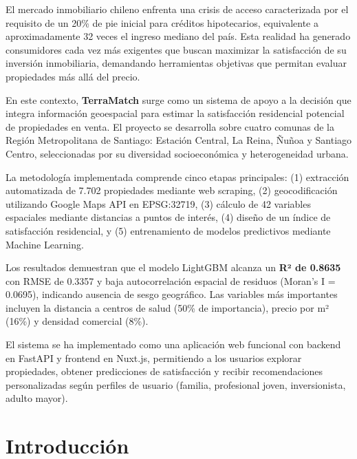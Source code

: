 \documentclass[11pt,letterpaper]{article}
\begin{document}
El mercado inmobiliario chileno enfrenta una crisis de acceso caracterizada por el requisito de un 20\% de pie inicial para créditos hipotecarios, equivalente a aproximadamente 32 veces el ingreso mediano del país. Esta realidad ha generado consumidores cada vez más exigentes que buscan maximizar la satisfacción de su inversión inmobiliaria, demandando herramientas objetivas que permitan evaluar propiedades más allá del precio.

En este contexto, \textbf{TerraMatch} surge como un sistema de apoyo a la decisión que integra información geoespacial para estimar la satisfacción residencial potencial de propiedades en venta. El proyecto se desarrolla sobre cuatro comunas de la Región Metropolitana de Santiago: Estación Central, La Reina, Ñuñoa y Santiago Centro, seleccionadas por su diversidad socioeconómica y heterogeneidad urbana.

La metodología implementada comprende cinco etapas principales: (1) extracción automatizada de 7.702 propiedades mediante web scraping, (2) geocodificación utilizando Google Maps API en EPSG:32719, (3) cálculo de 42 variables espaciales mediante distancias a puntos de interés, (4) diseño de un índice de satisfacción residencial, y (5) entrenamiento de modelos predictivos mediante Machine Learning.

Los resultados demuestran que el modelo LightGBM alcanza un \textbf{R² de 0.8635} con RMSE de 0.3357 y baja autocorrelación espacial de residuos (Moran's I = 0.0695), indicando ausencia de sesgo geográfico. Las variables más importantes incluyen la distancia a centros de salud (50\% de importancia), precio por m² (16\%) y densidad comercial (8\%).

El sistema se ha implementado como una aplicación web funcional con backend en FastAPI y frontend en Nuxt.js, permitiendo a los usuarios explorar propiedades, obtener predicciones de satisfacción y recibir recomendaciones personalizadas según perfiles de usuario (familia, profesional joven, inversionista, adulto mayor).

\newpage
\tableofcontents
\newpage

\section{Introducción}
\end{document}

